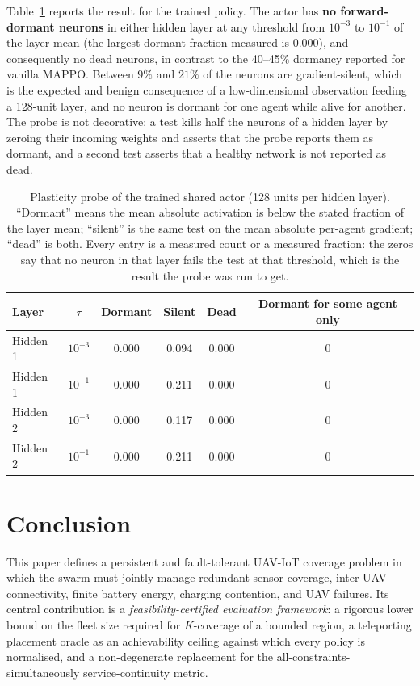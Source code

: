 \documentclass[conference]{IEEEtran}
\newcommand{\tokDormAHighDead}{0.000}
\newcommand{\tokDormAHighDormant}{0.000}
\newcommand{\tokDormAHighSilent}{0.211}
\newcommand{\tokDormALowDead}{0.000}
\newcommand{\tokDormALowDormant}{0.000}
\newcommand{\tokDormALowSilent}{0.094}
\newcommand{\tokDormASome}{0}
\newcommand{\tokDormBHighDead}{0.000}
\newcommand{\tokDormBHighDormant}{0.000}
\newcommand{\tokDormBHighSilent}{0.211}
\newcommand{\tokDormBLowDead}{0.000}
\newcommand{\tokDormBLowDormant}{0.000}
\newcommand{\tokDormBLowSilent}{0.117}
\newcommand{\tokDormBSome}{0}
\newcommand{\tokDormSilentMax}{21}
\newcommand{\tokDormSilentMin}{9}
\begin{document}
Table~\ref{tab:dormancy} reports the result for the trained policy. The
actor has \textbf{no forward-dormant neurons} in either hidden layer at any
threshold from $10^{-3}$ to $10^{-1}$ of the layer mean (the largest
dormant fraction measured is $0.000$), and consequently no
dead neurons, in contrast to the 40--45\% dormancy reported for vanilla
MAPPO. Between $\tokDormSilentMin\%$ and $\tokDormSilentMax\%$ of the
neurons are gradient-silent, which is the expected and benign consequence
of a low-dimensional observation feeding a 128-unit layer, and no neuron is
dormant for one agent while alive for another. The probe is not decorative: a test kills half the neurons of a
hidden layer by zeroing their incoming weights and asserts that the probe
reports them as dormant, and a second test asserts that a healthy network is
not reported as dead.

\begin{table}[t]
\caption{Plasticity probe of the trained shared actor (128 units per hidden
layer). ``Dormant'' means the mean absolute activation is below the stated
fraction of the layer mean; ``silent'' is the same test on the mean absolute
per-agent gradient; ``dead'' is both.  Every entry is a measured count or a
measured fraction: the zeros say that no neuron in that layer fails the
test at that threshold, which is the result the probe was run to get.}
\label{tab:dormancy}
\centering
\scriptsize
\begin{tabular}{@{}lccccc@{}}
\toprule
Layer & $\tau$ & Dormant & Silent & Dead & Dormant for some agent only \\
\midrule
Hidden 1 & $10^{-3}$ & \tokDormALowDormant & \tokDormALowSilent & \tokDormALowDead & \tokDormASome \\
Hidden 1 & $10^{-1}$ & \tokDormAHighDormant & \tokDormAHighSilent & \tokDormAHighDead & \tokDormASome \\
Hidden 2 & $10^{-3}$ & \tokDormBLowDormant & \tokDormBLowSilent & \tokDormBLowDead & \tokDormBSome \\
Hidden 2 & $10^{-1}$ & \tokDormBHighDormant & \tokDormBHighSilent & \tokDormBHighDead & \tokDormBSome \\
\bottomrule
\end{tabular}
\end{table}

\section{Conclusion}
This paper defines a persistent and fault-tolerant UAV-IoT coverage problem in which the swarm must jointly manage redundant sensor coverage, inter-UAV connectivity, finite battery energy, charging contention, and UAV failures. Its central contribution is a \emph{feasibility-certified evaluation framework}: a rigorous lower bound on the fleet size required for $K$-coverage of a bounded region, a teleporting placement oracle as an achievability ceiling against which every policy is normalised, and a non-degenerate replacement for the all-constraints-simultaneously service-continuity metric.
\end{document}
